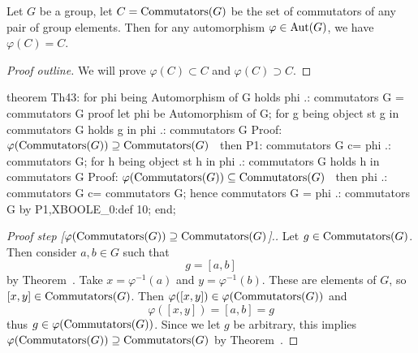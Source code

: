 \begin{theorem}
Let $G$ be a group, let $C=\operatorname{Commutators}(G)$ be the set of
commutators of any pair of group elements. Then for any automorphism
$\varphi\in\operatorname{Aut}(G)$, we have $\varphi(C) = C$.
\end{theorem}

\begin{proof}[Proof outline]
We will prove $\varphi(C)\subset C$ and $\varphi(C)\supset C$.
\end{proof}

\nwenddocs{}\endmoddef\nwstartdeflinemarkup{}\nwenddeflinemarkup
theorem Th43:
  for phi being Automorphism of G
  holds phi .: commutators G = commutators G
proof
  let phi be Automorphism of G;
  for g being object
  st g in commutators G
  holds g in phi .: commutators G
  \LA{}Proof: $\varphi(\operatorname{Commutators}(G))\supseteq\operatorname{Commutators}(G)$~{\nwtagstyle{}}\RA{}
  then P1: commutators G c= phi .: commutators G;
  for h being object
  st h in phi .: commutators G
  holds h in commutators G
  \LA{}Proof: $\varphi(\operatorname{Commutators}(G))\subseteq\operatorname{Commutators}(G)$~{\nwtagstyle{}}\RA{}
  then phi .: commutators G c= commutators G;
  hence commutators G = phi .: commutators G by P1,XBOOLE_0:def 10;
end;
\eatline
{}\nwendcode{}\nwdocspar
\begin{proof}[{Proof step [$\varphi(\operatorname{Commutators}(G))\supseteq\operatorname{Commutators}(G)$]}.]
  Let $g\in\operatorname{Commutators}(G)$. Then consider $a,b\in G$ such that
  \begin{equation}
g = [a,b]
  \end{equation}
  by Theorem~. Take $x=\varphi^{-1}(a)$ and
  $y=\varphi^{-1}(b)$. These are elements of $G$, so $[x,y]\in\operatorname{Commutators}(G)$.
  Then $\varphi([x,y])\in\varphi(\operatorname{Commutators}(G))$ and
  \begin{equation}
\varphi([x,y])=[a,b]=g
  \end{equation}
  thus $g\in\varphi(\operatorname{Commutators}(G))$. Since we let $g$ be arbitrary,
  this implies $\varphi(\operatorname{Commutators}(G))\supseteq\operatorname{Commutators}(G)$ by Theorem~.
\end{proof}

